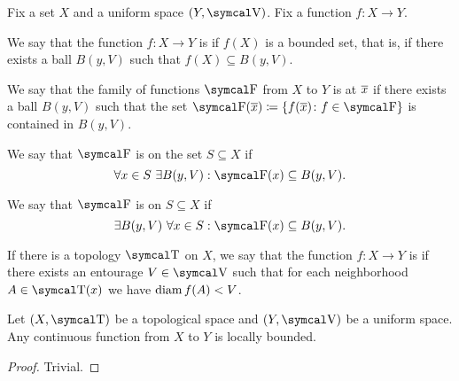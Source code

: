 \begin{definition}\label{def:bounded_function}
  Fix a set \( X \) and a uniform space \( (Y, \CV) \). Fix a function \( f: X \to Y \).

  \begin{defenum}
     We say that the function \( f: X \to Y \) is  if \( f(X) \) is a bounded set, that is, if there exists a ball \( B(y, V) \) such that \( f(X) \subseteq B(y, V) \).

     We say that the family of functions \( \CF \) from \( X \) to \( Y \) is  at \( \overline{x} \) if there exists a ball \( B(y, V) \) such that the set \( \CF(\Ol x) \coloneqq \{ f(\Ol x) \colon f \in \CF \} \) is contained in \( B(y, V) \).

     We say that \( \CF \) is  on the set \( S \subseteq X \) if
    \begin{equation*}
      \forall x \in S \ \exists B(y, V) : \CF(x) \subseteq B(y, V).
    \end{equation*}

     We say that \( \CF \) is  on \( S \subseteq X \) if
    \begin{equation*}
      \exists B(y, V) \ \forall x \in S : \CF(x) \subseteq B(y, V).
    \end{equation*}

     If there is a topology \( \CT \) on \( X \), we say that the function \( f: X \to Y \) is  if there exists an entourage \( V \in \CV \) such that for each neighborhood \( A \in \CT(x) \) we have \( \operatorname{diam}{f(A)} < V \).
  \end{defenum}
\end{definition}

\begin{proposition}\label{thm:continuous_implies_locally_bounded}
  Let \( (X, \CT) \) be a topological space and \( (Y, \CV) \) be a uniform space. Any continuous function from \( X \) to \( Y \) is locally bounded.
\end{proposition}
\begin{proof}
  Trivial.
\end{proof}

